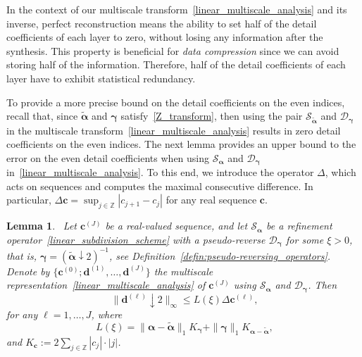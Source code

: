 \documentclass[12pt]{article}
\newtheorem{lemma}[theorem]{Lemma}
\begin{document}
In the context of our multiscale transform~\eqref{linear_multiscale_analysis} and its inverse, perfect reconstruction means the ability to set half of the detail coefficients of each layer to zero, without losing any information after the synthesis. This property is beneficial for \emph{data compression} since we can avoid storing half of the information. Therefore, half of the detail coefficients of each layer have to exhibit statistical redundancy.

To provide a more precise bound on the detail coefficients on the even indices, recall that, since $\widetilde{\boldsymbol{\alpha}}$ and $\boldsymbol{\gamma}$ satisfy~\eqref{Z_transform}, then using the pair $\mathcal{S}_{\widetilde{\boldsymbol{\alpha}}}$ and $\mathcal{D}_{\boldsymbol{\gamma}}$ in the multiscale transform~\eqref{linear_multiscale_analysis} results in zero detail coefficients on the even indices. The next lemma provides an upper bound to the error on the even detail coefficients when using $\mathcal{S}_{\boldsymbol{\alpha}}$ and $ \mathcal{D}_{\boldsymbol{\gamma}}$ in~\eqref{linear_multiscale_analysis}. To this end, we introduce the operator $\Delta$, which acts on sequences and computes the maximal consecutive difference. In particular, $\Delta \boldsymbol{c}= \sup_{j\in\mathbb{Z}}|c_{j+1} - c_{j}|$ for any real sequence $\boldsymbol{c}$.

\begin{lemma}~\label{lem:details}
    Let $\boldsymbol{c}^{(J)}$ be a real-valued sequence, and let $\mathcal{S}_{\boldsymbol{\alpha}}$ be a refinement operator~\eqref{linear_subdivision_scheme} with a pseudo-reverse $\mathcal{D}_{\boldsymbol{\gamma}}$ for some $\xi>0$, that is, $\boldsymbol{\gamma}=(\widetilde{\boldsymbol{\alpha}}\downarrow2)^{-1}$, see Definition~\ref{defin:pseudo-reversing_operators}. Denote by $\{\boldsymbol{c}^{(0)};\boldsymbol{d}^{(1)},\dots,\boldsymbol{d}^{(J)}\}$ the multiscale representation~\eqref{linear_multiscale_analysis} of $\boldsymbol{c}^{(J)}$ using $\mathcal{S}_{\boldsymbol{\alpha}}$ and $ \mathcal{D}_{\boldsymbol{\gamma}}$. Then
    \begin{equation}~\label{linear_details_bound}
        \|\boldsymbol{d}^{(\ell)}\downarrow 2\|_\infty \leq L(\xi)\Delta\boldsymbol{c}^{(\ell)},
    \end{equation}
    for any $\ell=1,\dots,J$, where
    \begin{equation}~\label{eqn:constant_L}
        L(\xi) = \|\boldsymbol{\alpha} -\widetilde{\boldsymbol{\alpha}}\|_1K_{\boldsymbol{\gamma}} + \|\boldsymbol{\gamma}\|_1 K_{\boldsymbol{\alpha}-\widetilde{\boldsymbol{\alpha}}},
    \end{equation}
    and $K_{\boldsymbol{c}}:=2\sum_{j\in\mathbb{Z}}|c_j|\cdot|j|$.
\end{lemma}
\end{document}
